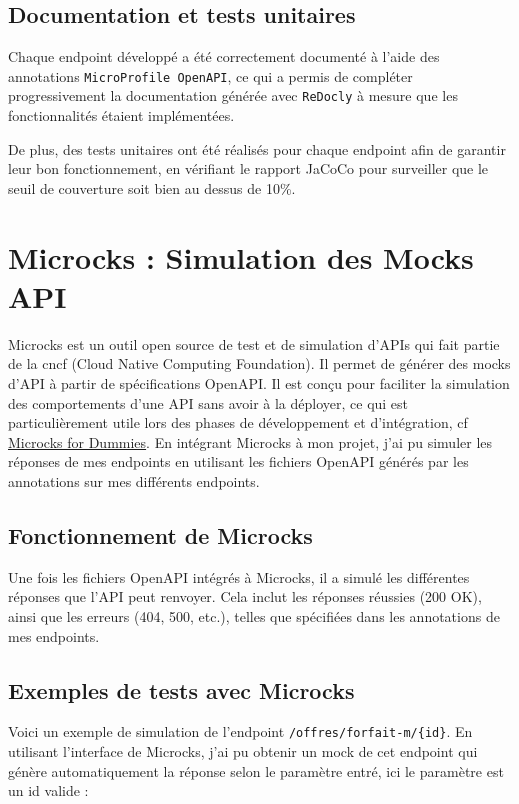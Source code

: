 \documentclass[11pt]{article}
\begin{document}
		
		\subsection*{Documentation et tests unitaires}
		
		Chaque endpoint développé a été correctement documenté à l'aide des annotations \texttt{MicroProfile OpenAPI}, ce qui a permis de compléter progressivement la documentation générée avec \texttt{ReDocly} à mesure que les fonctionnalités étaient implémentées.
		
		De plus, des tests unitaires ont été réalisés pour chaque endpoint afin de garantir leur bon fonctionnement, en vérifiant le rapport JaCoCo pour surveiller que le seuil de couverture soit bien au dessus de 10\%.
		
		\section{Microcks : Simulation des Mocks API}
		
	Microcks est un outil open source de test et de simulation d'APIs qui fait partie de la cncf (Cloud Native Computing Foundation). Il permet de générer des mocks d'API à partir de spécifications OpenAPI. Il est conçu pour faciliter la simulation des comportements d'une API sans avoir à la déployer, ce qui est particulièrement utile lors des phases de développement et d'intégration, cf \href{https://dev.to/optnc/microcks-for-dummies-1imn}{Microcks for Dummies}. En intégrant Microcks à mon projet, j'ai pu simuler les réponses de mes endpoints en utilisant les fichiers OpenAPI générés par les annotations sur mes différents endpoints.
		
		\subsection*{Fonctionnement de Microcks}
		
		Une fois les fichiers OpenAPI intégrés à Microcks, il a simulé les différentes réponses que l'API peut renvoyer. Cela inclut les réponses réussies (200 OK), ainsi que les erreurs (404, 500, etc.), telles que spécifiées dans les annotations de mes endpoints.
		
		\subsection*{Exemples de tests avec Microcks}
		
		Voici un exemple de simulation de l'endpoint \texttt{/offres/forfait-m/\{id\}}. En utilisant l'interface de Microcks, j'ai pu obtenir un mock de cet endpoint qui génère automatiquement la réponse selon le paramètre entré, ici le paramètre est un id valide : 
		
\end{document}
